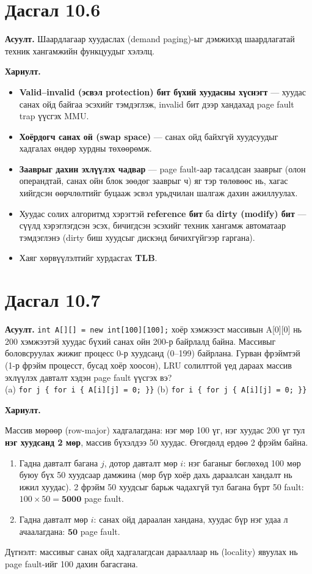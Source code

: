 \documentclass[12pt,a4paper]{article}
\newcommand{\question}[2]{\section{Дасгал #1}\textbf{Асуулт.} #2\par\medskip\textbf{Хариулт.}\par}
\begin{document}
\question{10.6}{Шаардлагаар хуудаслах (demand paging)-ыг дэмжихэд шаардлагатай техник хангамжийн функцуудыг хэлэлц.}

\begin{itemize}[leftmargin=1.5em]
  \item \textbf{Valid–invalid (эсвэл protection) бит бүхий хуудасны хүснэгт} — хуудас санах ойд байгаа эсэхийг тэмдэглэж, invalid бит дээр хандахад page fault trap үүсгэх MMU.
  \item \textbf{Хоёрдогч санах ой (swap space)} — санах ойд байхгүй хуудсуудыг хадгалах өндөр хурдны төхөөрөмж.
  \item \textbf{Зааврыг дахин эхлүүлэх чадвар} — page fault-аар тасалдсан зааврыг (олон операндтай, санах ойн блок зөөдөг зааврыг ч) яг тэр төлөвөөс нь, хагас хийгдсэн өөрчлөлтийг буцааж эсвэл урьдчилан шалгаж дахин ажиллуулах.
  \item Хуудас солих алгоритмд хэрэгтэй \textbf{reference бит} ба \textbf{dirty (modify) бит} — сүүлд хэрэглэгдсэн эсэх, бичигдсэн эсэхийг техник хангамж автоматаар тэмдэглэнэ (dirty биш хуудсыг дискэнд бичихгүйгээр гаргана).
  \item Хаяг хөрвүүлэлтийг хурдасгах \textbf{TLB}.
\end{itemize}

\question{10.7}{\texttt{int A[][] = new int[100][100];} хоёр хэмжээст массивын A[0][0] нь 200 хэмжээтэй хуудас бүхий санах ойн 200-р байрлалд байна. Массивыг боловсруулах жижиг процесс 0-р хуудсанд (0–199) байрлана. Гурван фрэймтэй (1-р фрэйм процесст, бусад хоёр хоосон), LRU солилттой үед дараах массив эхлүүлэх давталт хэдэн page fault үүсгэх вэ?\\ (a) \texttt{for j \{ for i \{ A[i][j] = 0; \}\}} \quad (b) \texttt{for i \{ for j \{ A[i][j] = 0; \}\}}}

Массив мөрөөр (row-major) хадгалагдана: нэг мөр 100 үг, нэг хуудас 200 үг тул \textbf{нэг хуудсанд 2 мөр}, массив бүхэлдээ 50 хуудас. Өгөгдөлд ердөө 2 фрэйм байна.
\begin{enumerate}[label=(\alph*), leftmargin=1.5em]
  \item Гадна давталт багана $j$, дотор давталт мөр $i$: нэг баганыг бөглөхөд 100 мөр буюу бүх 50 хуудсаар дамжина (мөр бүр хоёр дахь дараалсан хандалт нь ижил хуудас). 2 фрэйм 50 хуудсыг барьж чадахгүй тул багана бүрт 50 fault: $100 \times 50 = \mathbf{5000}$ page fault.
  \item Гадна давталт мөр $i$: санах ойд дараалан хандана, хуудас бүр нэг удаа л ачаалагдана: $\mathbf{50}$ page fault.
\end{enumerate}
Дүгнэлт: массивыг санах ойд хадгалагдсан дарааллаар нь (locality) явуулах нь page fault-ийг 100 дахин багасгана.
\end{document}
